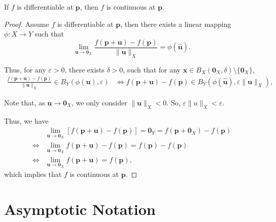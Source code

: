 \documentclass{article}
\begin{document}
\begin{proposition}
	If $f$ is differentiable at $\mathbf p$, then $f$ is continuous at $\mathbf p$.
	
	\begin{proof}
		Assume $f$ is differentiable at $\mathbf p$, then there exists a linear mapping $\phi: X \to Y$ such that
		$$
		\lim_{\mathbf u \to \mathbf 0_X} \frac{f(\mathbf p + \mathbf u) - f(\mathbf p)}{\| \mathbf u \|_X} = \phi(\mathbf{\hat u}).
		$$
		
		Thus, for any $\varepsilon > 0$, there exists $\delta > 0$, such that for any $\mathbf x \in B_X(\mathbf 0_X, \delta) \setminus \{\mathbf 0_X\}$,
		$$
		\begin{aligned}
			\frac{f(\mathbf p + \mathbf u) - f(\mathbf p)}{\| \mathbf u \|_X} \in B_Y(\phi(\mathbf u), \varepsilon) &\iff f(\mathbf p + \mathbf u) - f(\mathbf p) \in B_Y(\phi(\mathbf{\hat u}), \varepsilon \| \mathbf u \|_X),
		\end{aligned}
		$$
		
		Note that, as $\mathbf u \to \mathbf 0_X$, we only consider $\| \mathbf u \|_X < 0$. So, $\varepsilon \| u \|_X < \varepsilon$.
		
		Thus, we have
		$$
		\begin{aligned}
			& \lim_{\mathbf u \to \mathbf 0_X} [f(\mathbf p + \mathbf u) - f(\mathbf p)] = \mathbf 0_Y = f(\mathbf p + \mathbf 0_X) - f(\mathbf p) \\
			\iff & \lim_{\mathbf u \to \mathbf 0_X} f(\mathbf p + \mathbf u) - f(\mathbf p) = f(\mathbf p) - f(\mathbf p) \\
			\iff & \lim_{\mathbf u \to \mathbf 0_X} f(\mathbf p + \mathbf u) = f(\mathbf p),
		\end{aligned}
		$$
		which implies that $f$ is continuous at $\mathbf p$.
	\end{proof}
\end{proposition}


\section{Asymptotic Notation}
\end{document}

